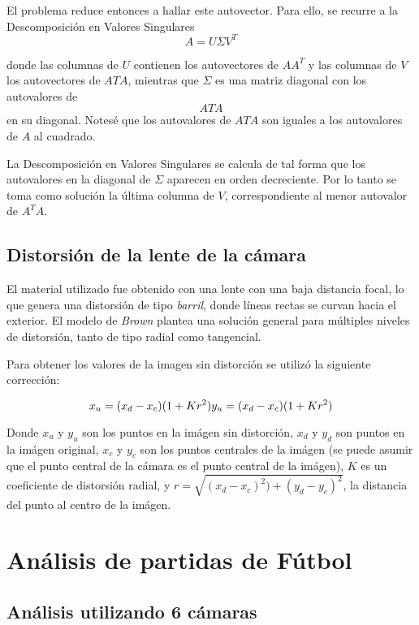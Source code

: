 \documentclass[a4paper,10pt]{article}
\begin{document}
El problema reduce entonces a hallar este autovector. Para ello, se recurre a la Descomposición en Valores Singulares
\begin{equation}
    A = U\Sigma V^{T}
\end{equation}

donde las columnas de $U$ contienen los autovectores de $AA^{T}$ y las columnas de $V$ los autovectores de $A{T}A$, mientras que $\Sigma$ es una matriz
diagonal con los autovalores de $$A{T}A$$ en su diagonal. Notesé que los autovalores de $A{T}A$ son iguales a los autovalores de $A$ al cuadrado.

La Descomposición en Valores Singulares se calcula de tal forma que los autovalores en la diagonal de $\Sigma$ aparecen en orden decreciente. Por lo tanto
se toma como solución la última columna de $V$, correspondiente al menor autovalor de $A^{T}A$.

\subsection{Distorsión de la lente de la cámara}

El material utilizado fue obtenido con una lente con una baja distancia focal,
lo que genera una distorsión de tipo \textit{barril}, donde líneas rectas
se curvan hacia el exterior. El modelo de \textit{Brown} plantea una solución
general para múltiples niveles de distorsión, tanto de tipo radial como
tangencial.

Para obtener los valores de la imagen sin distorción se utilizó la siguiente
corrección:

\[
  x_u = (x_d - x_c) (1+K r^2) \\
  y_u = (x_d - x_c) (1+K r^2)
\]

Donde $x_u$ y $y_u$ son los puntos en la imágen sin distorción, $x_d$ y $y_d$ son
puntos en la imágen original, $x_c$ y $y_c$ son los puntos centrales de la
imágen (se puede asumir que el punto central de la cámara es el punto central
de la imágen), $K$ es un coeficiente de distorsión radial, y $r =
\sqrt{(x_d-x_c)^2) + (y_d-y_c)^2}$, la distancia del punto al centro de la
imágen.


\section{Análisis de partidas de Fútbol}
\label{sec:futbol}

\subsection{Análisis utilizando 6 cámaras}
\label{sec:6-camaras}
\end{document}
